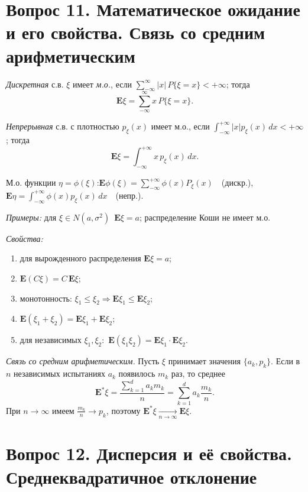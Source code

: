 \section*{Вопрос 11. Математическое ожидание и его свойства. Связь со средним арифметическим}

\textit{Дискретная} с.в. $\xi$ имеет \textit{м.о.}, если $\sum_{-\infty}^{\infty}|x|\,P\{\xi=x\}<+\infty$; тогда
\[ \mathbf{E}\xi=\sum_{-\infty}^{\infty}x\,P\{\xi=x\}. \]

\textit{Непрерывная} с.в. с плотностью $p_\xi(x)$ имеет м.о., если $\int_{-\infty}^{+\infty}|x|p_\xi(x)\,dx<+\infty$; тогда
\[ \mathbf{E}\xi=\int_{-\infty}^{+\infty}x\,p_\xi(x)\,dx. \]

М.о. функции $\eta=\phi(\xi)$:\quad $\mathbf{E}\phi(\xi)=\sum_{-\infty}^{+\infty}\phi(x)P_\xi(x)$\ \ (дискр.),\ \ $\mathbf{E}\eta=\int_{-\infty}^{+\infty}\phi(x)p_\xi(x)\,dx$\ \ (непр.).

\textit{Примеры:} для $\xi\in N(a,\sigma^2)$\ $\mathbf{E}\xi=a$; распределение Коши не имеет м.о.

\textit{Свойства:}
\begin{enumerate}
  \item для вырожденного распределения $\mathbf{E}\xi=a$;
  \item $\mathbf{E}(C\xi)=C\,\mathbf{E}\xi$;
  \item монотонность: $\xi_1\le\xi_2\Rightarrow\mathbf{E}\xi_1\le\mathbf{E}\xi_2$;
  \item $\mathbf{E}(\xi_1+\xi_2)=\mathbf{E}\xi_1+\mathbf{E}\xi_2$;
  \item для независимых $\xi_1,\xi_2$:\ $\mathbf{E}(\xi_1\xi_2)=\mathbf{E}\xi_1\cdot\mathbf{E}\xi_2$.
\end{enumerate}

\textit{Связь со средним арифметическим.} Пусть $\xi$ принимает значения $\{a_k,p_k\}$. Если в $n$ независимых испытаниях $a_k$ появилось $m_k$ раз, то среднее
\[ \mathbf{E}^{*}\xi=\frac{\sum_{k=1}^{d}a_k m_k}{n}=\sum_{k=1}^{d}a_k\frac{m_k}{n}. \]
При $n\to\infty$ имеем $\frac{m_k}{n}\to p_k$, поэтому $\mathbf{E}^{*}\xi\xrightarrow[n\to\infty]{}\mathbf{E}\xi$.

\section*{Вопрос 12. Дисперсия и её свойства. Среднеквадратичное отклонение}

